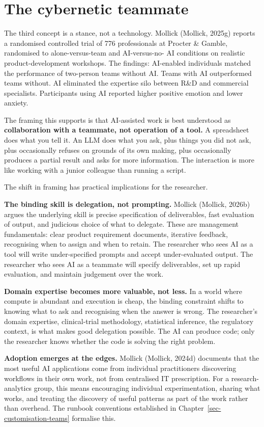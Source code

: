 \documentclass[
  letterpaper,
  11pt]{scrbook}
\begin{document}
\section{The cybernetic teammate}\label{the-cybernetic-teammate}

The third concept is a stance, not a technology. Mollick (Mollick,
2025g) reports a randomised controlled trial of 776 professionals at
Procter \& Gamble, randomised to alone-versus-team and AI-versus-no- AI
conditions on realistic product-development workshops. The findings:
AI-enabled individuals matched the performance of two-person teams
without AI. Teams with AI outperformed teams without. AI eliminated the
expertise silo between R\&D and commercial specialists. Participants
using AI reported higher positive emotion and lower anxiety.

The framing this supports is that AI-assisted work is best understood as
\textbf{collaboration with a teammate, not operation of a tool.} A
spreadsheet does what you tell it. An LLM does what you ask, plus things
you did not ask, plus occasionally refuses on grounds of its own making,
plus occasionally produces a partial result and asks for more
information. The interaction is more like working with a junior
colleague than running a script.

The shift in framing has practical implications for the researcher.

\textbf{The binding skill is delegation, not prompting.} Mollick
(Mollick, 2026b) argues the underlying skill is precise specification of
deliverables, fast evaluation of output, and judicious choice of what to
delegate. These are management fundamentals: clear product requirement
documents, iterative feedback, recognising when to assign and when to
retain. The researcher who sees AI as a tool will write under-specified
prompts and accept under-evaluated output. The researcher who sees AI as
a teammate will specify deliverables, set up rapid evaluation, and
maintain judgement over the work.

\textbf{Domain expertise becomes more valuable, not less.} In a world
where compute is abundant and execution is cheap, the binding constraint
shifts to knowing what to ask and recognising when the answer is wrong.
The researcher's domain expertise, clinical-trial methodology,
statistical inference, the regulatory context, is what makes good
delegation possible. The AI can produce code; only the researcher knows
whether the code is solving the right problem.

\textbf{Adoption emerges at the edges.} Mollick (Mollick, 2024d)
documents that the most useful AI applications come from individual
practitioners discovering workflows in their own work, not from
centralised IT prescription. For a research-analytics group, this means
encouraging individual experimentation, sharing what works, and treating
the discovery of useful patterns as part of the work rather than
overhead. The runbook conventions established in
Chapter~\ref{sec-customisation-teams} formalise this.
\end{document}
